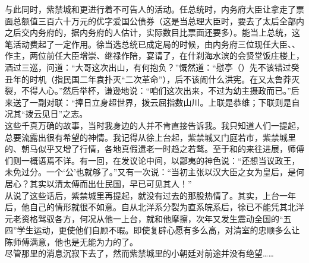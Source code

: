 与此同时，紫禁城和更进行着不可告人的活动。任总统时，内务府大臣让拿走了票面总额值三百六十万元的优字爱国公债券（这是当总理大臣时，要去了太后全部内之后交内务府的，据内务府的人估计，实际数目比票面还要多）。能当上总统，这笔活动费起了一定作用。徐当选总统已成定局的时候，由内务府三位现任大臣、、作主，两位前任大臣增崇、继禄作陪，宴请了，在什刹海水滨的会贤堂饭庄楼上，酒过三巡，问道：“大哥这次出山，有何抱负？”慨然道：“慰亭（）先不该错过癸丑年的时机（指民国二年袁扑灭“二次革命”），后不该闹什么洪宪。在又太鲁莽灭裂，不得人心。”然后举杯，谦逊地说：“咱们这次出来，不过为幼主摄政而已。”后来送了一副对联：“捧日立身超世界，拨云屈指数山川。上联是恭维；下联则是自况其“拨云见日”之志。\\

这些千真万确的故事，当时我身边的人并不肯直接告诉我。我只知道人们一提起，总要流露出很有希望的神情。我记得从徐上台起，紫禁城又门庭若市，紫禁城里的、朝马似乎又增了行情，各地真假遗老一时趋之若鹜。至于和的来往进展，师傅们则一概语焉不详。有一回，在发议论中间，以鄙夷的神色说：“还想当议政王，未免过分。一个‘公’也就够了。”又有一次说：“当初主张以汉大臣之女为皇后，是何居心？其实以清太傅而出仕民国，早已可见其人！”\\

从说了这些话后，紫禁城里再提起，就没有过去的那股热情了。其实，上台一年后，他自己的情形就很不如意。自从北洋系分裂为直系皖系后，徐已不能凭其北洋元老资格驾驭各方，何况从他一上台，就和他摩擦，次年又发生震动全国的“五四”学生运动，更使他们自顾不暇。即使复辟心愿有多么高，对清室的忠顺多么让陈师傅满意，他也是无能为力的了。\\

尽管那里的消息沉寂下去了，然而紫禁城里的小朝廷对前途并没有绝望……
